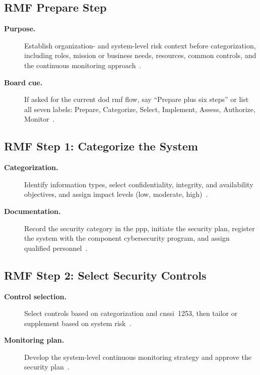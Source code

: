 \documentclass[../main.tex]{subfiles}
\begin{document}
\subsection{RMF Prepare Step}
\begin{description}
  \item[\textbf{Purpose.}] Establish organization- and system-level risk context before categorization, including roles, mission or business needs, resources, common controls, and the continuous monitoring approach~\autocite{DoDI8510-01}.
  \item[\textbf{Board cue.}] If asked for the current \ac{dod} \ac{rmf} flow, say ``Prepare plus six steps'' or list all seven labels: Prepare, Categorize, Select, Implement, Assess, Authorize, Monitor~\autocite{DoDI8510-01}.
\end{description}

\subsection{RMF Step 1: Categorize the System}
\begin{description}
  \item[\textbf{Categorization.}] Identify information types, select confidentiality, integrity, and availability objectives, and assign impact levels (low, moderate, high)~\autocite{edo-3-4-3-cybersecurity-awareness-2025}.
  \item[\textbf{Documentation.}] Record the security category in the \ac{ppp}, initiate the security plan, register the system with the component cybersecurity program, and assign qualified personnel~\autocite{edo-3-4-3-cybersecurity-awareness-2025}.
\end{description}

\subsection{RMF Step 2: Select Security Controls}
\begin{description}
  \item[\textbf{Control selection.}] Select controls based on categorization and \ac{cnssi}~1253, then tailor or supplement based on system risk~\autocite{edo-3-4-3-cybersecurity-awareness-2025}.
  \item[\textbf{Monitoring plan.}] Develop the system-level continuous monitoring strategy and approve the security plan~\autocite{edo-3-4-3-cybersecurity-awareness-2025}.
\end{description}
\end{document}
